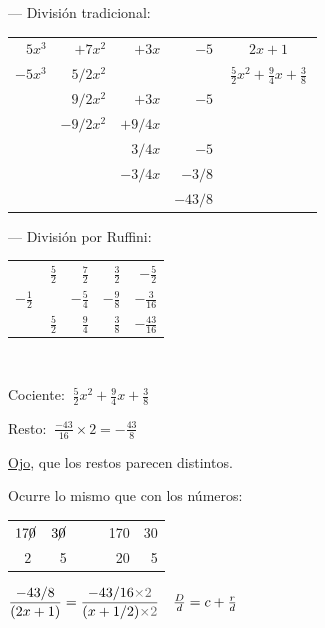 \begin{miejercicio}
\vspace{2mm} --- División tradicional:
\begin{table}[H]
\centering
\begin{tabular}{rrrrc}
$5x^3$ & $+7x^2$ & $+3x$ & \multicolumn{1}{r|}{$-5$} & $2x+1$ \\ \cline{5-5} 
$-5x^3$ & $5/2 x^2$ &  &  & $\ \frac 5 2 x^2 + \frac 9 4 x + \frac 3 8 \ $ \\ \cline{1-2}
 & $9/2 x^2$ & $+3x$ & $-5$ &  \\
 & $-9/2 x^2$ & $+9/4 x$ &  &  \\ \cline{2-3}
 &  & $3/4 x$ & $-5$ &  \\
 &  & $-3/4 x$ & $-3/8$ &  \\ \cline{3-4}
 &  &  & $-43/8$ & 
\end{tabular}
\end{table}


\begin{multicols}{2}
--- División por Ruffini:
\begin{table}[H]
\centering
\begin{tabular}{r|rrrr}
 & $\frac 5 2 $ & $\frac 7 2$ & $\frac 3 2 $ & $-\frac 5 2$ \\
$-\frac 1 2 \ $ &  & $-\frac 5 4$ & $-\frac 9 8$ & $-\frac 3{16}$ \\ \hline
 & $\frac 5 2 $ & $\frac 9 4$ & \multicolumn{1}{r|}{$\frac 3 8$} & $-\frac{43}{16}$ \\ \cline{5-5} 
\end{tabular}
\end{table}
$\quad$

Cociente: $\ \frac 5 2 x^2 + \frac 9 4 x + \frac 3 8$

Resto: $\ \frac{-43}{16}\times{2}=-\frac{43}{8}$

\underline{Ojo}, que los restos parecen distintos.
\end{multicols}
Ocurre lo mismo que con los números:

\begin{multicols}{2}
\begin{table}[H]
\centering
\begin{tabular}{rrrrr}
\multicolumn{1}{r|}{$17\cancel{0}$} & $3\cancel{0}$ & $\quad$ & \multicolumn{1}{r|}{170} & 30 \\ \cline{2-2} \cline{5-5} 
$2\ \ $ & 5 &  & 20 & 5
\end{tabular}
\end{table}
$\dfrac{-43/8}{(2x+1)} = \dfrac{-43/16 \textcolor{gris}{\times 2}}{(x+1/2) \textcolor{gris}{\times 2}}\ \ \  \frac D d=c+\frac r d$  
\end{multicols}
\end{miejercicio}

